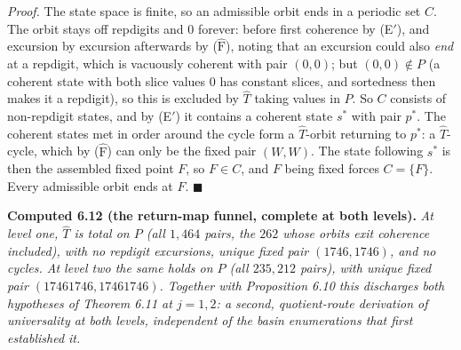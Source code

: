 \documentclass[11pt,letterpaper]{article}
\theoremstyle{paperstyle}
\theoremstyle{paperstyledef}
\theoremstyle{paperstylerem}
\begin{document}
\emph{Proof.} The state space is finite, so an admissible orbit ends in a periodic set \(C\). The orbit stays off repdigits and \(0\) forever: before first coherence by (E\('\)), and excursion by excursion afterwards by (\(\widehat{\mathrm{F}}\)), noting that an excursion could also \emph{end} at a repdigit, which is vacuously coherent with pair \((0,0)\); but \((0,0) \notin P\) (a coherent state with both slice values \(0\) has constant slices, and sortedness then makes it a repdigit), so this is excluded by \(\widehat{T}\) taking values in \(P\). So \(C\) consists of non-repdigit states, and by (E\('\)) it contains a coherent state \(s^{\ast}\) with pair \(p^{\ast}\). The coherent states met in order around the cycle form a \(\widehat{T}\)-orbit returning to \(p^{\ast}\): a \(\widehat{T}\)-cycle, which by (\(\widehat{\mathrm{F}}\)) can only be the fixed pair \((W, W)\). The state following \(s^{\ast}\) is then the assembled fixed point \(F\), so \(F \in C\), and \(F\) being fixed forces \(C = \{F\}\). Every admissible orbit ends at \(F\). \(\blacksquare\)

\textbf{Computed 6.12 (the return-map funnel, complete at both levels).} \emph{At level one, \(\widehat{T}\) is total on \(P\) (all \(1{,}464\) pairs, the \(262\) whose orbits exit coherence included), with no repdigit excursions, unique fixed pair \((1746, 1746)\), and no cycles. At level two the same holds on \(P\) (all \(235{,}212\) pairs), with unique fixed pair \((17461746, 17461746)\). Together with Proposition 6.10 this discharges both hypotheses of Theorem 6.11 at \(j = 1, 2\): a second, quotient-route derivation of universality at both levels, independent of the basin enumerations that first established it.}
\end{document}
